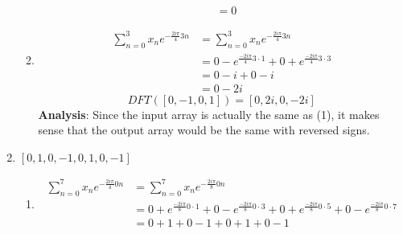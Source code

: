 \documentclass{article}
\begin{document}
\begin{enumerate}[label=\Alph*)]
\begin{enumerate}[label={k=\arabic*}, start=0]
\begin{align*}
                                                                           & = 0
                        \end{align*}
                  \item \begin{align*}
                              \sum_{n=0}^{3}{x_n e^{-\frac{2 i \pi}{4}3n}} & = \sum_{n=0}^{3}{x_n e^{-\frac{2 i \pi}{4}3n}}                                \\
                                                                           & = 0 - e^{\frac{-2 i \pi}{4} 3 \cdot 1} + 0 + e^{\frac{-2 i \pi}{4} 3 \cdot 3} \\
                                                                           & = 0 - i + 0 - i                                                               \\
                                                                           & = 0 - 2i
                        \end{align*}
                        \begin{equation*}
                              DFT([0, -1, 0, 1]) = [0, 2i, 0, -2i]
                        \end{equation*}
                        \textbf{Analysis}: Since the input array is actually the same as (1), it makes sense that the output array would be the same with reversed signs.
            \end{enumerate}
      \item \pagebreak \([0, 1, 0, -1, 0, 1, 0, -1]\)
            \begin{enumerate}[label={k=\arabic*}, start=0]
                  \item \begin{align*}
                              \sum_{n=0}^{7}{x_n e^{-\frac{2 i \pi}{4}0n}} & = \sum_{n=0}^{7}{x_n e^{-\frac{2 i \pi}{8}0n}}                                                                                                              \\
                                                                           & = 0 + e^{\frac{-2 i \pi}{8} 0 \cdot 1} + 0 - e^{\frac{-2 i \pi}{8} 0 \cdot 3} + 0 + e^{\frac{-2 i \pi}{8} 0 \cdot 5} + 0 - e^{\frac{-2 i \pi}{8} 0 \cdot 7} \\
                                                                           & = 0 + 1 + 0 - 1 + 0 + 1 + 0 - 1                                                                                                                             \\

\end{align*}
\end{enumerate}
\end{enumerate}
\end{document}
